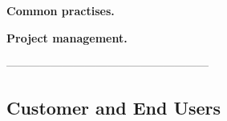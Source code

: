 

\textbf{Common practises.}



\textbf{Project management.}





------------------------------------------------------










% 





% 




\subsection{Customer and End Users}